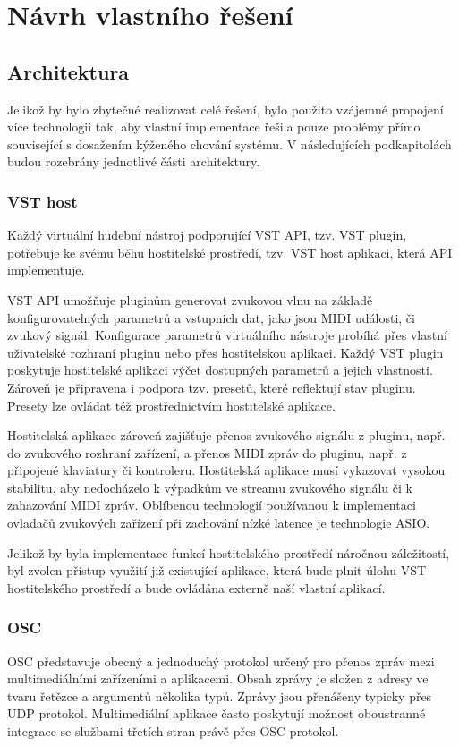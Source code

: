 \documentclass[thesis=M,czech]{FITthesis}[2019/03/06]
\begin{document}
\chapter{Návrh vlastního řešení}
	\section{Architektura}
		Jelikož by bylo zbytečné realizovat celé řešení, bylo použito vzájemné propojení více technologií tak,
		aby vlastní implementace řešila pouze problémy přímo související s dosažením kýženého chování systému. V následujících podkapitolách
		budou rozebrány jednotlivé části architektury.
		
		\subsection{VST host}
			Každý virtuální hudební nástroj podporující VST API, tzv. VST plugin, potřebuje ke svému běhu hostitelské prostředí, tzv. VST host aplikaci, která API implementuje\cite{vstdoc}.
			
			VST API umožňuje pluginům generovat zvukovou vlnu na základě konfigurovatelných
			parametrů a vstupních dat, jako jsou MIDI události, či zvukový signál.
			Konfigurace parametrů virtuálního nástroje probíhá přes vlastní uživatelské rozhraní pluginu nebo přes hostitelskou aplikaci.
			Každý VST plugin poskytuje hostitelské aplikaci výčet dostupných parametrů a jejich vlastnosti.
			Zároveň je připravena i podpora tzv. presetů, které reflektují stav pluginu. Presety lze ovládat též prostřednictvím
			hostitelské aplikace.
			
			Hostitelská aplikace zároveň zajišťuje přenos zvukového signálu z pluginu, např. do zvukového rozhraní zařízení,
			a přenos MIDI zpráv do pluginu, např. z připojené klaviatury či kontroleru. Hostitelská aplikace musí vykazovat
			vysokou stabilitu, aby nedocházelo k výpadkům ve streamu zvukového signálu či k zahazování MIDI zpráv. Oblíbenou 
			technologií používanou k implementaci ovladačů zvukových zařízení při zachování nízké latence je technologie ASIO\cite{asio}.
			
			Jelikož by byla implementace funkcí hostitelského prostředí náročnou záležitostí, byl zvolen přístup využití
			již existující aplikace, která bude plnit úlohu VST hostitelského prostředí a bude ovládána externě naší vlastní aplikací.
			
		\subsection{OSC}		
			OSC představuje obecný a jednoduchý protokol určený pro přenos zpráv mezi multimediálními zařízeními a aplikacemi\cite{osc}.
			Obsah zprávy je složen z adresy ve tvaru řetězce a argumentů několika typů.
			Zprávy jsou přenášeny typicky přes UDP protokol. Multimediální aplikace často poskytují možnost oboustranné integrace
			se službami třetích stran právě přes OSC protokol.
\end{document}
